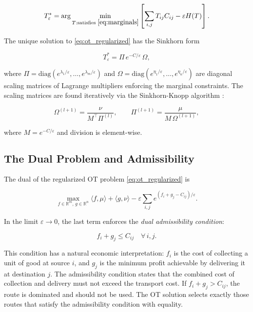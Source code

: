 \documentclass[12pt]{article}
\newcommand{\Tij}{T_{ij}}
\newcommand{\Cij}{C_{ij}}
\newcommand{\eps}{\varepsilon}
\begin{document}
\begin{equation}
T^*_\eps = \arg\min_{T: \text{satisfies } \eqref{eq:marginals}} \left[\sum_{i,j} \Tij \Cij - \eps H(T)\right].
\label{eq:ot_regularized}
\end{equation}

The unique solution to \eqref{eq:ot_regularized} has the Sinkhorn form

\begin{equation}
T^*_\eps = \Pi\, e^{-C/\eps}\, \Omega,
\label{eq:sinkhorn_form}
\end{equation}

where $\Pi = \mathrm{diag}(e^{\lambda_1/\eps}, \ldots, e^{\lambda_m/\eps})$ and $\Omega = \mathrm{diag}(e^{\eta_1/\eps}, \ldots, e^{\eta_n/\eps})$ are diagonal scaling matrices of Lagrange multipliers enforcing the marginal constraints. The scaling matrices are found iteratively via the Sinkhorn-Knopp algorithm \citep{sinkhorn1964, cuturi2013}:

\begin{equation}
\Omega^{(l+1)} = \frac{\nu}{M^\top \Pi^{(l)}}, \qquad \Pi^{(l+1)} = \frac{\mu}{M\, \Omega^{(l+1)}},
\label{eq:sinkhorn_iteration}
\end{equation}

where $M = e^{-C/\eps}$ and division is element-wise.

\subsection{The Dual Problem and Admissibility}

The dual of the regularized OT problem \eqref{eq:ot_regularized} is \citep[see][for the full duality theory]{villani2003, galichon2016}

\begin{equation}
\max_{f \in \mathbb{R}^m,\, g \in \mathbb{R}^n} \langle f, \mu \rangle + \langle g, \nu \rangle - \eps \sum_{i,j} e^{(f_i + g_j - C_{ij})/\eps}.
\label{eq:ot_dual}
\end{equation}

In the limit $\eps \to 0$, the last term enforces the \emph{dual admissibility condition}:

\begin{equation}
f_i + g_j \leq \Cij \quad \forall\, i, j.
\label{eq:dual_admissibility}
\end{equation}

This condition has a natural economic interpretation: $f_i$ is the cost of collecting a unit of good at source $i$, and $g_j$ is the minimum profit achievable by delivering it at destination $j$. The admissibility condition states that the combined cost of collection and delivery must not exceed the transport cost. If $f_i + g_j > \Cij$, the route is dominated and should not be used. The OT solution selects exactly those routes that satisfy the admissibility condition with equality.
\end{document}
